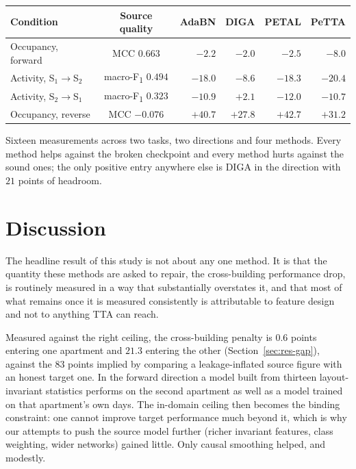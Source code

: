 \documentclass[a4paper,fleqn]{cas-dc}
\newcommand{\macf}{macro-F\textsubscript{1}}
\begin{document}
\begin{center}\footnotesize
\begin{tabular}{@{}lcrrrr@{}}
\toprule
Condition & Source quality & AdaBN & DIGA & PETAL & PeTTA \\
\midrule
Occupancy, forward & MCC $0.663$   & $-2.2$ & $-2.0$ & $-2.5$ & $-8.0$ \\
Activity, S$_1\!\to$S$_2$ & \macf{} $0.494$ & $-18.0$ & $-8.6$ & $-18.3$ & $-20.4$ \\
Activity, S$_2\!\to$S$_1$ & \macf{} $0.323$ & $-10.9$ & $+2.1$ & $-12.0$ & $-10.7$ \\
Occupancy, reverse & MCC $-0.076$  & $+40.7$ & $+27.8$ & $+42.7$ & $+31.2$ \\
\bottomrule
\end{tabular}
\end{center}

Sixteen measurements across two tasks, two directions and four methods. Every method helps
against the broken checkpoint and every method hurts against the sound ones; the only
positive entry anywhere else is DIGA in the direction with $21$ points of headroom.

\section{Discussion}
\label{sec:discussion}

The headline result of this study is not about any one method. It is that the quantity
these methods are asked to repair, the cross-building performance drop, is routinely
measured in a way that substantially overstates it, and that most of what remains once it is
measured consistently is attributable to feature design and not to anything TTA can
reach.

Measured against the right ceiling, the cross-building penalty is $0.6$ points entering
one apartment and $21.3$ entering the other (Section~\ref{sec:res-gap}), against the $83$
points implied by comparing a leakage-inflated source figure with an honest target one.
In the forward direction a model built from thirteen layout-invariant statistics performs
on the second apartment as well as a model trained on that apartment's own days. The
in-domain ceiling then becomes the binding constraint: one cannot improve target
performance much beyond it, which is why our attempts to push the source model further
(richer invariant features, class weighting, wider networks) gained little. Only causal
smoothing helped, and modestly.
\end{document}
